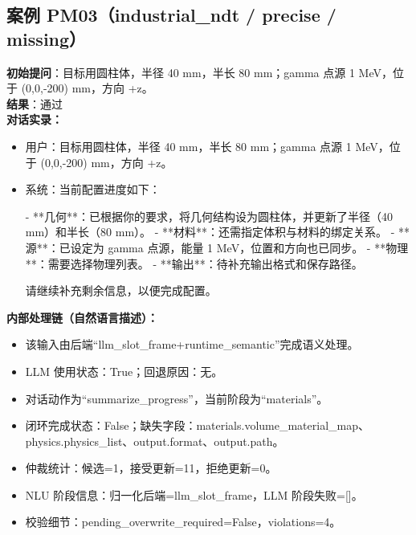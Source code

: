 \documentclass[11pt]{ctexart}
\begin{document}
\subsection{案例 PM03（industrial\_ndt / precise / missing）}
\textbf{初始提问}：目标用圆柱体，半径 40 mm，半长 80 mm；gamma 点源 1 MeV，位于 (0,0,-200) mm，方向 +z。\\
\textbf{结果}：通过\\
\textbf{对话实录：}
\begin{itemize}
\item 用户：目标用圆柱体，半径 40 mm，半长 80 mm；gamma 点源 1 MeV，位于 (0,0,-200) mm，方向 +z。
\item 系统：当前配置进度如下：

- **几何**：已根据你的要求，将几何结构设为圆柱体，并更新了半径（40 mm）和半长（80 mm）。
- **材料**：还需指定体积与材料的绑定关系。
- **源**：已设定为 gamma 点源，能量 1 MeV，位置和方向也已同步。
- **物理**：需要选择物理列表。
- **输出**：待补充输出格式和保存路径。

请继续补充剩余信息，以便完成配置。
\end{itemize}
\textbf{内部处理链（自然语言描述）：}
\begin{itemize}
\item 该输入由后端“llm\_slot\_frame+runtime\_semantic”完成语义处理。
\item LLM 使用状态：True；回退原因：无。
\item 对话动作为“summarize\_progress”，当前阶段为“materials”。
\item 闭环完成状态：False；缺失字段：materials.volume\_material\_map、physics.physics\_list、output.format、output.path。
\item 仲裁统计：候选=1，接受更新=11，拒绝更新=0。
\item NLU 阶段信息：归一化后端=llm\_slot\_frame，LLM 阶段失败=[]。
\item 校验细节：pending\_overwrite\_required=False，violations=4。
\end{itemize}
\end{document}
